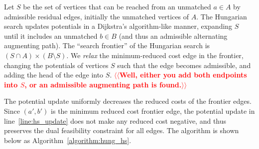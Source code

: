\documentclass[a4paper,UKenglish]{socg-lipics-v2018}
\makeatletter
\def\note#1{\textcolor{red}{{#1}}}
\DeclareMathOperator*{\argmin}{arg\,min}
\theoremstyle{plain}
\numberwithin{figure}{section}
\def\n@te#1{\textsf{\boldmath \textbf{$\langle\!\langle$#1$\rangle\!\rangle$}}\leavevmode}
\def\note#1{\textcolor{red}{\n@te{#1}}}
\makeatother
\begin{document}
Let $S$ be the set of vertices that can be reached from an unmatched $a \in A$
by admissible residual edges, initially the unmatched vertices of $A$.
The Hungarian search updates potentials in a Dijkstra's algorithm-like manner,
expanding $S$ until it includes an unmatched $b \in B$ (and thus an admissible
alternating augmenting path).
The ``search frontier'' of the Hungarian search is
$(S \cap A) \times (B \setminus S)$.
We \emph{relax} the minimum-reduced cost edge in the frontier, changing the
potentials of vertices $S$ such that the edge becomes admissible, and adding
the head of the edge into $S$.
\note{Well, either you add both endpoints into $S$, or an admissible augmenting path is found.}

The potential update uniformly decreases the reduced costs of the frontier
edges.
Since $(a', b')$ is the minimum reduced cost frontier edge, the potential
update in line~\ref{line:hs_update} does not make any reduced cost negative,
and thus preserves the dual feasibility constraint for all edges.
The algorithm is shown below as Algorithm~\ref{algorithm:hung_hs}.

\end{document}
